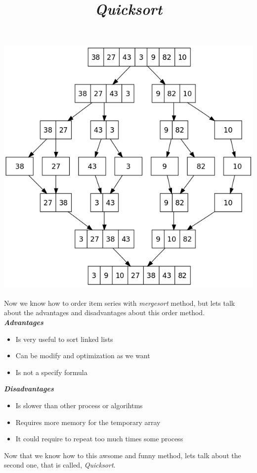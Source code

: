 \documentclass[12pt, letterpaper]{article}
\begin{document}
\includegraphics[width=\textwidth]{Merge_sort_algorithm.png}
\\
\\
Now we know how to order item series with \textit{mergesort} method, but lets talk about the advantages and disadvantages about this order method.
\\
\textbf{\textit{Advantages}}
\begin{itemize}
\item Is very useful to sort linked lists
\item Can be modify and optimization as we want
\item Is not a specify formula
\end{itemize}
\textbf{\textit{Disadvantages}}
\begin{itemize}
\item Is slower than other process or algorihtms
\item Requires more memory for the temporary array
\item It could require to repeat too much times some process
\end{itemize}
Now that we know how to this awsome and funny method, lets talk about the second one, that is called, \textit{Quicksort}.
\\
\\
\title{\textbf{\textit{Quicksort}}}\\
\end{document}
